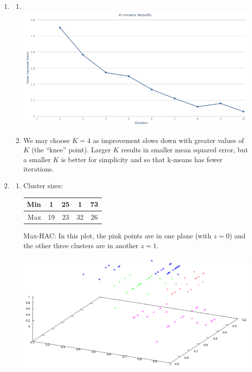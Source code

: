 \documentclass{article}
\begin{document}
\begin{enumerate}
\item
  \begin{enumerate}
  \item \mbox{}\\ \includegraphics[scale=0.5]{kmeansresults.png}
  \item We may choose $K=4$ as improvement slows down with greater
    values of $K$ (the ``knee'' point). Larger $K$ results in smaller
    mean squared error, but a smaller $K$ is better for simplicity and
    so that k-means has fewer iterations.
  \end{enumerate}
\item
  \begin{enumerate}
  \item Cluster sizes:

    \begin{tabular}{|r|c|c|c|c|}\hline
      Min & 1 & 25 & 1 & 73\\\hline
      Max & 19 & 23 & 32 & 26\\\hline
    \end{tabular}

    Max-HAC: In this plot, the pink points are in one plane (with $z=0$) and
    the other three clusters are in another $z=1$.
    \begin{center}
      \includegraphics[scale=.3]{max_hac.png}
    \end{center}


\end{enumerate}
\end{enumerate}
\end{document}
